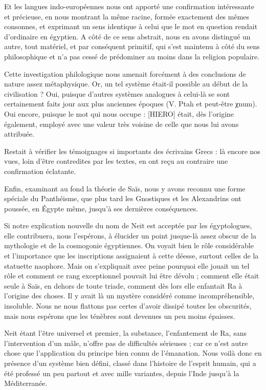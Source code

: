 \documentclass[a4paper, 11pt, oneside]{article}
\begin{document}
Et les langues indo-européennes nous ont apporté une confirmation intéressante et précieuse, en nous montrant la même racine, formée exactement des mêmes consonnes, et exprimant un sens identique à celui que le mot en question rendait d'ordinaire en égyptien. A côté de ce sens abstrait, nous en avons distingué un autre, tout matériel, et par conséquent primitif, qui s'est maintenu à côté du sens philosophique et n'a pas cessé de prédominer au moins dans la religion populaire.

Cette investigation philologique nous amenait forcément à des conclusions de nature assez métaphysique. Or, un tel système était-il possible au début de la civilisation ? Oui, puisque d'autres systèmes analogues à celui-là se sont certainement faits jour aux plus anciennes époques (V. Ptah et peut-être χnum). Oui encore, puisque le mot qui nous occupe : [HIERO] était, dès l'origine également, employé avec une valeur très voisine de celle que nous lui avons attribuée.

Restait à vérifier les témoignages si importants des écrivains Grecs : là encore nos vues, loin d'être contredites par les textes, en ont reçu au contraire une confirmation éclatante.

Enfin, examinant au fond la théorie de Saïs, nous y avons reconnu une forme spéciale du Panthéisme, que plus tard les Gnostiques et les Alexandrins ont poussée, en Égypte même, jusqu'à ses dernières conséquences.

Si notre explication nouvelle du nom de Neit est acceptée par les égyptologues, elle contribuera, nous l'espérons, à élucider un point jusque-là assez obscur de la mythologie et de la cosmogonie égyptiennes. On voyait bien le rôle considérable et l'importance que les inscriptions assignaient à cette déesse, surtout celles de la statuette naophore. Mais on s'expliquait avec peine pourquoi elle jouait un tel rôle et comment ce rang exceptionnel pouvait lui être dévolu ; comment elle était seule à Saïs, en dehors de toute triade, comment dès lors elle enfantait Ra à l'origine des choses. Il y avait là un mystère considéré comme incompréhensible, insoluble. Nous ne nous flattons pas certes d'avoir dissipé toutes les obscurités, mais nous espérons que les ténèbres sont devenues un peu moins épaisses.

Neit étant l'être universel et premier, la substance, l'enfantement de Ra, sans l'intervention d'un mâle, n'offre pas de difficultés sérieuses ; car ce n'est autre chose que l'application du principe bien connu de l'émanation. Nous voilà donc en présence d'un système bien défini, classé dans l'histoire de l'esprit humain, qui a été professé un peu partout et avec mille variantes, depuis l'Inde jusqu'à la Méditerranée.
\end{document}
